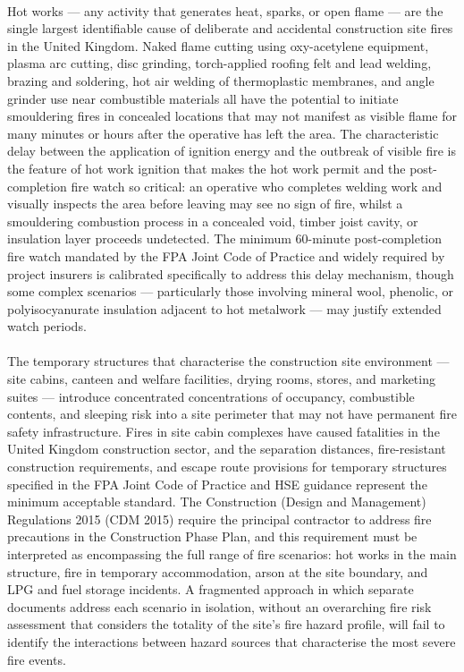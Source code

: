 \paragraph{}
Hot works --- any activity that generates heat, sparks, or open flame --- are the single largest identifiable cause of deliberate and accidental construction site fires in the United Kingdom. Naked flame cutting using oxy-acetylene equipment, plasma arc cutting, disc grinding, torch-applied roofing felt and lead welding, brazing and soldering, hot air welding of thermoplastic membranes, and angle grinder use near combustible materials all have the potential to initiate smouldering fires in concealed locations that may not manifest as visible flame for many minutes or hours after the operative has left the area. The characteristic delay between the application of ignition energy and the outbreak of visible fire is the feature of hot work ignition that makes the hot work permit and the post-completion fire watch so critical: an operative who completes welding work and visually inspects the area before leaving may see no sign of fire, whilst a smouldering combustion process in a concealed void, timber joist cavity, or insulation layer proceeds undetected. The minimum 60-minute post-completion fire watch mandated by the FPA Joint Code of Practice and widely required by project insurers is calibrated specifically to address this delay mechanism, though some complex scenarios --- particularly those involving mineral wool, phenolic, or polyisocyanurate insulation adjacent to hot metalwork --- may justify extended watch periods.

\paragraph{}
The temporary structures that characterise the construction site environment --- site cabins, canteen and welfare facilities, drying rooms, stores, and marketing suites --- introduce concentrated concentrations of occupancy, combustible contents, and sleeping risk into a site perimeter that may not have permanent fire safety infrastructure. Fires in site cabin complexes have caused fatalities in the United Kingdom construction sector, and the separation distances, fire-resistant construction requirements, and escape route provisions for temporary structures specified in the FPA Joint Code of Practice and HSE guidance represent the minimum acceptable standard. The Construction (Design and Management) Regulations 2015 (CDM 2015) require the principal contractor to address fire precautions in the Construction Phase Plan, and this requirement must be interpreted as encompassing the full range of fire scenarios: hot works in the main structure, fire in temporary accommodation, arson at the site boundary, and LPG and fuel storage incidents. A fragmented approach in which separate documents address each scenario in isolation, without an overarching fire risk assessment that considers the totality of the site's fire hazard profile, will fail to identify the interactions between hazard sources that characterise the most severe fire events.

